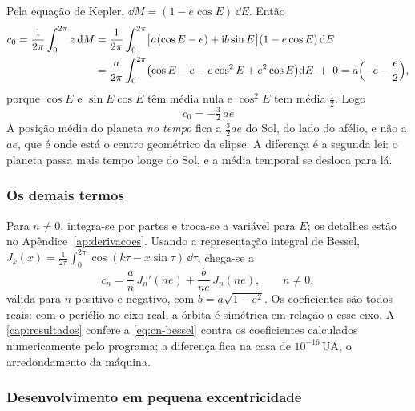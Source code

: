 Pela equação de Kepler, $\dd M = (1 - e\cos E)\,\dd E$. Então
\begin{align}
  c_0 = \frac{1}{2\pi}\int_0^{2\pi} z\,\mathrm{d} M
  &= \frac{1}{2\pi}\int_0^{2\pi}\bigl[a(\cos E - e) + \mathrm{i} b\sin E\bigr](1-e\cos E)\,\mathrm{d} E \nonumber\\
  &= \frac{a}{2\pi}\int_0^{2\pi}\bigl(\cos E - e - e\cos^2E + e^2\cos E\bigr)\mathrm{d} E \;+\; 0
   = a\Bigl(-e - \frac{e}{2}\Bigr),
\end{align}
porque $\cos E$ e $\sin E\cos E$ têm média nula e $\cos^2E$ tem média $\tfrac12$. Logo
\begin{equation}
  \boxed{\;c_0 = -\tfrac{3}{2}\,a e\;}
  \label{eq:c0}
\end{equation}
A posição média do planeta \emph{no tempo} fica a $\tfrac32 ae$ do Sol, do lado do afélio, e não a $ae$, que é onde está o centro geométrico da elipse. A diferença é a segunda lei: o planeta passa mais tempo longe do Sol, e a média temporal se desloca para lá.

\subsubsection{Os demais termos}

Para $n\neq0$, integra-se por partes e troca-se a variável para $E$; os detalhes estão no Apêndice~\ref{ap:derivacoes}. Usando a representação integral de Bessel, $J_k(x) = \frac{1}{2\pi}\int_0^{2\pi}\cos(k\tau - x\sin\tau)\,\dd\tau$, chega-se a
\begin{equation}
  \boxed{\;c_n = \frac{a}{n}\,J_n'(ne) + \frac{b}{ne}\,J_n(ne),\qquad n\neq 0,\;}
  \label{eq:cn-bessel}
\end{equation}
válida para $n$ positivo e negativo, com $b = a\sqrt{1-e^2}$. Os coeficientes são todos reais: com o periélio no eixo real, a órbita é simétrica em relação a esse eixo. A \autoref{cap:resultados} confere a \autoref{eq:cn-bessel} contra os coeficientes calculados numericamente pelo programa; a diferença fica na casa de $10^{-16}$\,UA, o arredondamento da máquina.

\subsubsection{Desenvolvimento em pequena excentricidade}\label{sec:pequeno-e}

